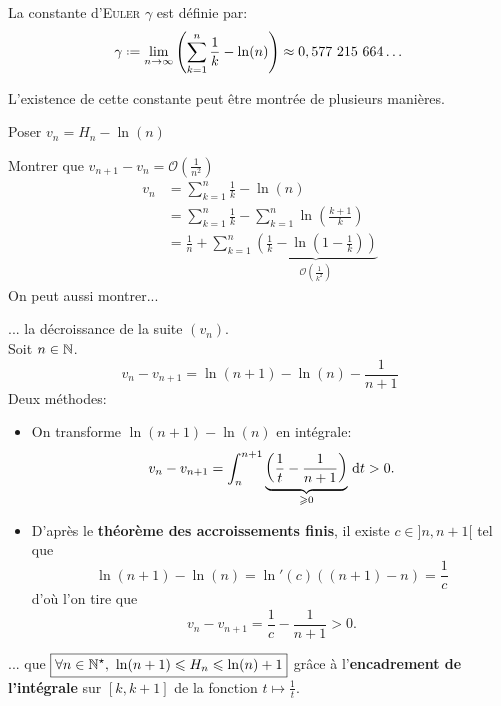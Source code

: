 \begin{defi}
    La constante d'\textsc{Euler} $\gamma$ est définie par:
    $$\gamma \defeq \lim_{n \to \infty} \left(\sum_{k=1}^{n} \frac{1}{k} - \ln(n) \right) \approx 0,577\ 215\ 664 \dots$$
\end{defi}

\begin{marginfigure}[-3cm]
	
\end{marginfigure}

L'existence de cette constante peut être montrée de plusieurs manières.

\begin{preuve}
    \item Poser $v_n = H_n - \ln(n)$
    \item Montrer que $v_{n+1}-v_n = \mathcal{O}\left(\frac{1}{n^2}\right)$\\
    \begin{align*}
        v_n &= \sum_{k=1}^n\frac{1}{k} -\ln(n) \\
        &= \sum_{k=1}^n \frac{1}{k} -\sum_{k=1}^n  \ln\left( \frac{k+1}{k} \right) \\
        &= \frac{1}{n} + \sum_{k=1}^n \underbrace{\left( \frac{1}{k} - \ln\left(1-\frac{1}{k}\right)\right)}_{\mathcal{O}\left(\frac{1}{k^2}\right)}
    \end{align*}
    On peut aussi montrer...
    \item ... la décroissance de la suite $(v_n)$. \\
    Soit $n \in \mathbb{N}$. 
    $$v_n - v_{n+1} = \ln(n+1) - \ln(n) - \frac{1}{n+1}$$
    Deux méthodes:
    \begin{itemize}
        \item On transforme $\ln(n+1) - \ln(n)$ en intégrale:
        $$v_n - v_{n+1} = \int_{n}^{n+1} \underbrace{\left( \frac{1}{t} - \frac{1}{n+1} \right)}_{\geqslant 0} \, \mathrm{d} t > 0.$$
        \item D'après le \textbf{théorème des accroissements finis}, il existe $c \in ]n, n+1[$ tel que 
        $$\ln(n+1) - \ln(n) = \ln'(c)((n+1) - n) = \frac{1}{c}$$
        d'où l'on tire que 
        $$v_n - v_{n+1} = \frac{1}{c} - \frac{1}{n+1} > 0.$$
    \end{itemize}
    \item ... que $\boxed{\forall n \in \Ne,\ \ln(n+1) \leqslant H_n \leqslant \ln(n) + 1}$ grâce à l'\textbf{encadrement de l'intégrale} sur $[k, k+1]$ de la fonction $t \mapsto \frac{1}{t}$.
\end{preuve}

